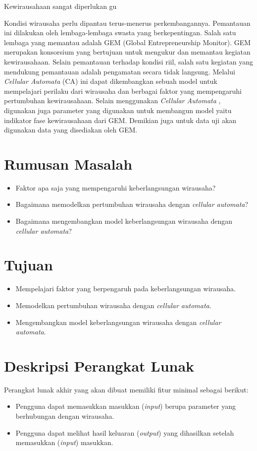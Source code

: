 \documentclass[a4paper,twoside]{article}
\begin{document}
Kewirausahaan sangat diperlukan gu


Kondisi wirausaha perlu dipantau terus-menerus perkembangannya. Pemantauan ini dilakukan oleh lembaga-lembaga swasta yang berkepentingan. Salah satu lembaga yang memantau adalah GEM (Global Entrepreneurship Monitor). GEM merupakan konsorsium yang bertujuan untuk mengukur dan memantau kegiatan kewirausahaan. Selain pemantauan terhadap kondisi riil, salah satu kegiatan yang mendukung pemantauan adalah pengamatan secara tidak langsung. Melalui \textit{Cellular Automata} (CA) ini dapat dikembangkan sebuah model untuk mempelajari perilaku dari wirausaha dan berbagai faktor yang mempengaruhi pertumbuhan kewirausahaan. Selain menggunakan \textit{Cellular Automata} , digunakan juga parameter yang digunakan untuk membangun model yaitu indikator fase kewirausahaan dari GEM. Demikian juga untuk data uji akan digunakan data yang disediakan oleh GEM. 


\section{Rumusan Masalah}
\begin{itemize}
	\item Faktor apa saja yang mempengaruhi keberlangsungan wirausaha?
	\item Bagaimana memodelkan pertumbuhan wirausaha dengan \textit{cellular automata}?
	\item Bagaimana mengembangkan model keberlangsungan wirausaha dengan \textit{cellular automata}?
\end{itemize}

\section{Tujuan}
\begin{itemize}
	\item Mempelajari faktor yang berpengaruh pada keberlangsungan wirausaha.
	\item Memodelkan pertumbuhan wirausaha dengan \textit{cellular automata}.
	\item Mengembangkan model keberlangsungan wirausaha dengan \textit{cellular automata}.
\end{itemize}

\section{Deskripsi Perangkat Lunak}
Perangkat lunak akhir yang akan dibuat memiliki fitur minimal sebagai berikut:
\begin{itemize}
	\item Pengguna dapat memasukkan masukkan (\textit{input}) berupa parameter yang berhubungan dengan wirausaha.
	\item Pengguna dapat melihat hasil keluaran (\textit{output}) yang dihasilkan setelah memasukkan (\textit{input}) masukkan.
\end{itemize}
\end{document}
